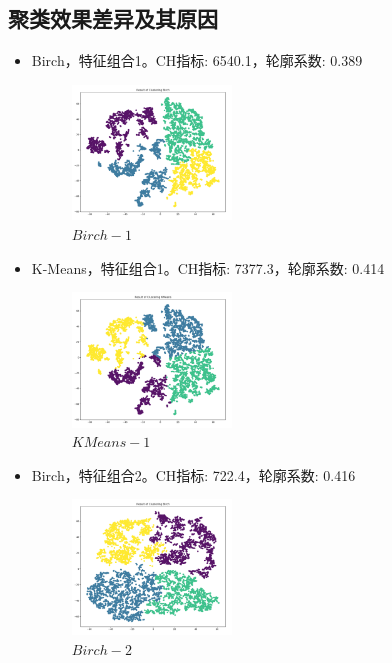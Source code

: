 \documentclass{acm_proc_article-sp}
\begin{document}
\subsection{聚类效果差异及其原因}
\begin{itemize}
    \item Birch，特征组合1。CH指标: 6540.1，轮廓系数: 0.389 
    \begin{figure}[H]
        \centering
        \caption{$Birch-1$}
        \includegraphics[width=0.4\textwidth]{1-1.png}
    \end{figure}
    \item K-Means，特征组合1。CH指标: 7377.3，轮廓系数: 0.414 
    \begin{figure}[H]
        \centering
        \caption{$KMeans-1$}
        \includegraphics[width=0.4\textwidth]{1-2.png}
    \end{figure}
    \item Birch，特征组合2。CH指标: 722.4，轮廓系数: 0.416 
    \begin{figure}[H]
        \centering
        \caption{$Birch-2$}
        \includegraphics[width=0.4\textwidth]{2-1.png}
    \end{figure}

\end{itemize}
\end{document}
